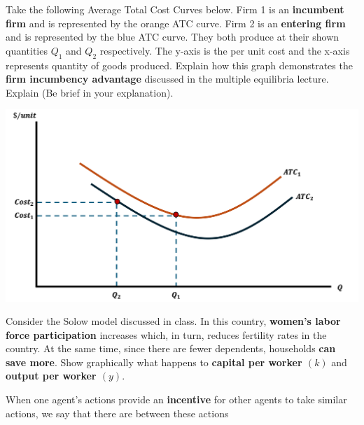 \documentclass[12pt]{exam}
\begin{document}
\begin{questions}
    
\question[10] 
Take the following Average Total Cost Curves below.
Firm 1 is an \textbf{incumbent firm} and is represented by the orange ATC curve.
Firm 2 is an \textbf{entering firm} and is represented by the blue ATC curve. 
They both produce at their shown quantities $Q_{1}$ and $Q_{2}$ respectively.
The y-axis is the per unit cost and the x-axis represents quantity of goods produced. 
Explain how this graph demonstrates the \textbf{firm incumbency advantage} discussed in the multiple equilibria lecture.
Explain (Be brief in your explanation).

\includegraphics[scale=0.3]{images/atc-curve.png}

\question[5]
Consider the Solow model discussed in class.
In this country, \textbf{women's labor force participation} increases which, in turn, reduces fertility rates in the country. 
At the same time, since there are fewer dependents, households \textbf{can save more}. 
Show graphically what happens to \textbf{capital per worker $(k)$} and \textbf{output per worker $(y)$}.

\newpage 

\question[2]
When one agent's actions provide an \textbf{incentive} for other agents to take similar actions, we say that there are \fillin[complementarities][4cm] between these actions


\end{questions}
\end{document}
